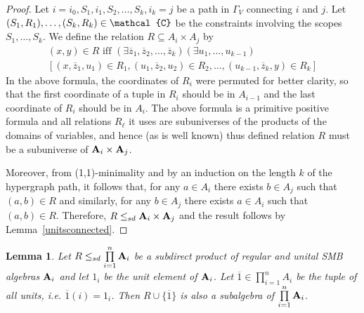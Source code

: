 \documentclass[11pt]{amsart}
\newcommand{\m}[1]{{\uppercase {\mathbf {#1}}}}
\newcommand{\vr}[1]{{\uppercase {\mathcal{#1}}}}
\newtheorem{lm}[thm]{Lemma}
\theoremstyle{definition}
\begin{document}
\begin{proof}
Let $i=i_0,S_1,i_1,S_2,\dots,S_k,i_k=j$ be a path in $\Gamma_V$ connecting $i$ and $j$. Let $(S_1,R_1),\dots,(S_k,R_k)\in \vr c$ be the constraints involving the scopes $S_1,\dots,S_k$. We define the relation $R\subseteq A_i\times A_j$ by
\[
\begin{gathered}
(x,y)\in R\text{ iff }(\exists\overline{z}_1,\overline{z}_2,\dots,\overline{z}_k)(\exists u_1,\dots,u_{k-1})\\
\left[
(x,\overline{z}_1,u_1)\in R_1,
(u_1,\overline{z}_2,u_2)\in R_2,\dots, (u_{k-1},\overline{z}_k,y)\in R_k
\right]
\end{gathered}
\]
In the above formula, the coordinates of $R_i$ were permuted for better clarity, so that the first coordinate of a tuple in $R_i$ should be in $A_{i-1}$ and the last coordinate of $R_i$ should be in $A_i$. The above formula is a primitive positive formula and all relations $R_\ell$ it uses are subuniverses of the products of the domains of variables, and hence (as is well known) thus defined relation $R$ must be a subuniverse of $\m a_i\times\m a_j$. 

Moreover, from (1,1)-minimality and by an induction on the length $k$ of the hypergraph path, it follows that, for any $a\in A_i$ there exists $b\in A_j$ such that $(a,b)\in R$ and similarly, for any $b\in A_j$ there exists $a\in A_i$ such that $(a,b)\in R$. Therefore, $R\leq_{sd}\m a_i\times\m a_j$ and the result follows by Lemma~\ref{unitsconnected}.
\end{proof}

\begin{lm}\label{addunittuple}
Let $R\leq_{sd}\prod\limits_{i=1}^n\m a_i$ be a subdirect product of regular and unital SMB algebras $\m a_i$ and let $1_i$ be the unit element of $\m a_i$. Let $\overline{1}\in \prod\limits_{i=1}^n A_i$ be the tuple of all units, i.e. $\overline{1}(i)=1_i$. Then $R\cup\{\overline{1}\}$ is also a subalgebra of $\prod\limits_{i=1}^n\m a_i$.
\end{lm}
\end{document}
